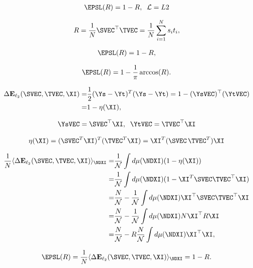 \begin{align}
  \EPSL(R)=1-R,\;\;\mathcal{L}=L2
\end{align}

\begin{align}
R=\frac{1}{N}\SVEC^{\top}\TVEC=\frac{1}{N}\sum_{i=1}^{N}s_{i}t_{i},
\end{align}

\begin{align}
\EPSL(R)=1-R  ,
\label{eqn:LinearPerceptronError}
\end{align}

\begin{align}
\EPSL(R)=1 - \dfrac{1}{\pi}\arccos(R).
\label{eqn:BooleanPerceptronError}
\end{align}

\begin{align}
\label{eqn:deriveSTerror}
\Delta \mathbf{E}_{\ell_2}(\SVEC,\TVEC,\XI) = & \frac{1}{2} (\Ys - \Yt)^T(\Ys - \Yt) 
   = 1 - (\YsVEC)^{\top}(\YtVEC) \\ \nonumber
   =&  1 - \eta(\XI),
\end{align}

\begin{align}
\YsVEC=\SVEC^{\top}\XI,\;\;
\YtVEC=\TVEC^{\top}\XI 
\end{align}

\begin{align}
\eta(\XI) = (\SVEC^T\XI)^T (\TVEC^T\XI) = \XI^T (\SVEC \, \TVEC^T )\XI 
\end{align}

\begin{align}
\frac{1}{N}\langle\Delta \mathbf{E}_{\ell_2}(\SVEC,\TVEC,\XI)\rangle_{\NDXI}  
   = &\frac{1}{\mathcal{N}}\int d\mu(\NDXI)(1-\eta(\XI)) \\ \nonumber
   = &\frac{1}{\mathcal{N}}\int d\mu(\NDXI)(1-\XI^T\SVEC\TVEC^{\top}\XI) \\ \label{eqn:XI_ST}
   = & \frac{N}{\mathcal{N}} - \frac{1}{\mathcal{N}}\int d\mu(\NDXI)\XI^{\top}\SVEC\TVEC^{\top}\XI \\ \nonumber
   = & \frac{N}{\mathcal{N}} - \frac{1}{\mathcal{N}}\int d\mu(\NDXI)N\XI^{\top} R\XI \\ \nonumber
   = & \frac{N}{\mathcal{N}} - R\frac{N}{\mathcal{N}}\int d\mu(\NDXI)\XI^{\top}\XI,
\end{align}

\begin{align}
\label{eqn:e0}
\EPSL(R)=\frac{1}{N}\langle\Delta \mathbf{E}_{\ell_2}(\SVEC,\TVEC,\XI)\rangle_{\NDXI} =  1 - R .
\end{align}

